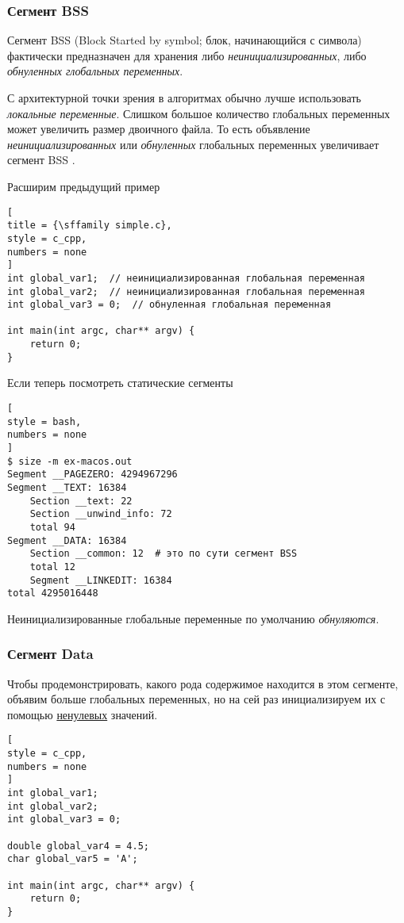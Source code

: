 \documentclass[%
	11pt,
	a4paper,
	utf8,
		]{article}
\begin{document}
\subsubsection{Сегмент BSS}

Сегмент BSS (Block Started by symbol; блок, начинающийся с символа) фактически предназначен для хранения либо \emph{неинициализированных}, либо \emph{обнуленных глобальных переменных}.

С архитектурной точки зрения в алгоритмах обычно лучше использовать \emph{локальные переменные}. Слишком большое количество глобальных переменных может увеличить размер двоичного файла. То есть объявление \emph{неинициализированных} или \emph{обнуленных} глобальных переменных увеличивает сегмент BSS \cite[]{amini-extreme-c:2022}.

Расширим предыдущий пример
\begin{lstlisting}[
title = {\sffamily simple.c},
style = c_cpp,
numbers = none
]
int global_var1;  // неинициализированная глобальная переменная
int global_var2;  // неинициализированная глобальная переменная
int global_var3 = 0;  // обнуленная глобальная переменная

int main(int argc, char** argv) {
    return 0;
}
\end{lstlisting}

Если теперь посмотреть статические сегменты
\begin{lstlisting}[
style = bash,
numbers = none
]
$ size -m ex-macos.out
Segment __PAGEZERO: 4294967296
Segment __TEXT: 16384
	Section __text: 22
	Section __unwind_info: 72
	total 94
Segment __DATA: 16384
	Section __common: 12  # это по сути сегмент BSS
	total 12
	Segment __LINKEDIT: 16384
total 4295016448
\end{lstlisting}

Неинициализированные глобальные переменные по умолчанию \emph{обнуляются}.

\subsubsection{Сегмент Data}

Чтобы продемонстрировать, какого рода содержимое находится в этом сегменте, объявим больше глобальных переменных, но на сей раз инициализируем их с помощью \underline{ненулевых} значений.
\begin{lstlisting}[
style = c_cpp,
numbers = none
]
int global_var1;
int global_var2;
int global_var3 = 0;

double global_var4 = 4.5;
char global_var5 = 'A';

int main(int argc, char** argv) {
    return 0;
}
\end{lstlisting}
\end{document}
